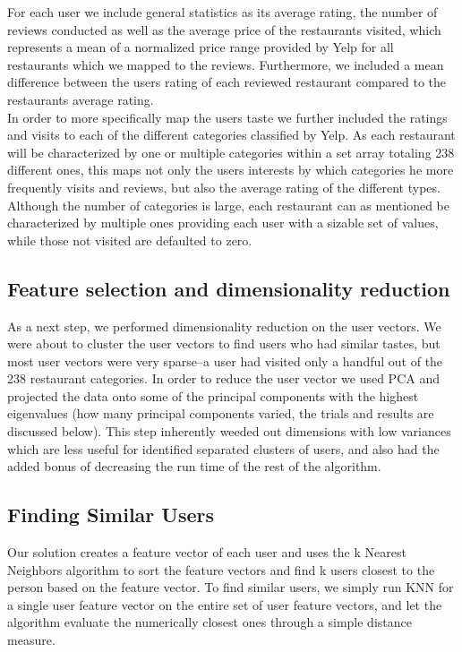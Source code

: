 \documentclass[10pt,twocolumn,letterpaper]{article}
\begin{document}
For each user we include general statistics as its average rating, the number of reviews conducted as well as the average price of the restaurants visited, which represents a mean of a normalized price range provided by Yelp for all restaurants which we mapped to the reviews. Furthermore, we included a mean difference between the users rating of each reviewed restaurant compared to the restaurants average rating. 
\\[.5em]
\indent In order to more specifically map the users taste we further included the ratings and visits to each of the different categories classified by Yelp. As each restaurant will be characterized by one or multiple categories within a set array totaling 238 different ones, this maps not only the users interests by which categories he more frequently visits and reviews, but also the average rating of the different types. Although the number of categories is large, each restaurant can as mentioned be characterized by multiple ones providing each user with a sizable set of values, while those not visited are defaulted to zero.

\subsection{Feature selection and dimensionality reduction}
As a next step, we performed dimensionality reduction on the user vectors. We were about to cluster the user vectors to find users who had similar tastes, but most user vectors were very sparse--a user had visited only a handful out of the 238 restaurant categories. In order to reduce the user vector we used PCA and projected the data onto some of the principal components with the highest eigenvalues (how many principal components varied, the trials and results are discussed below). This step inherently weeded out dimensions with low variances which are less useful for identified separated clusters of users, and also had the added bonus of decreasing the run time of the rest of the algorithm. 

\subsection{Finding Similar Users}
Our solution creates a feature vector of each user and uses the k Nearest Neighbors algorithm to sort the feature vectors and find k users closest to the person based on the feature vector. To find similar users, we simply run KNN for a single user feature vector on the entire set of user feature vectors, and let the algorithm evaluate the numerically closest ones through a simple distance measure. 
\end{document}
